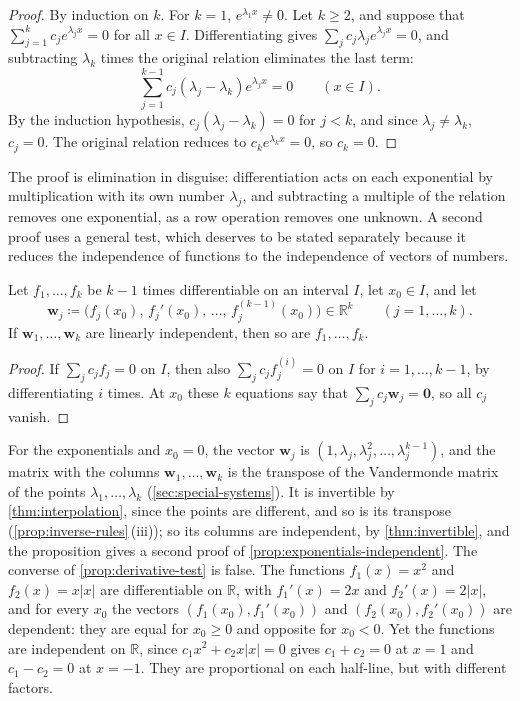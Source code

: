 \begin{proof}
By induction on $k$. For $k=1$, $e^{\lambda_1x}\ne0$. Let $k\ge2$, and suppose that $\sum_{j=1}^kc_je^{\lambda_jx}=0$ for all $x\in I$. Differentiating gives $\sum_jc_j\lambda_je^{\lambda_jx}=0$, and subtracting $\lambda_k$ times the original relation eliminates the last term:
\[
\sum_{j=1}^{k-1}c_j(\lambda_j-\lambda_k)e^{\lambda_jx}=0\qquad(x\in I).
\]
By the induction hypothesis, $c_j(\lambda_j-\lambda_k)=0$ for $j<k$, and since $\lambda_j\ne\lambda_k$, $c_j=0$. The original relation reduces to $c_ke^{\lambda_kx}=0$, so $c_k=0$.
\end{proof}

The proof is elimination in disguise: differentiation acts on each exponential by multiplication with its own number $\lambda_j$, and subtracting a multiple of the relation removes one exponential, as a row operation removes one unknown. A second proof uses a general test, which deserves to be stated separately because it reduces the independence of functions to the independence of vectors of numbers.

\begin{proposition}
\label{prop:derivative-test}
Let $f_1,\ldots,f_k$ be $k-1$ times differentiable on an interval $I$, let $x_0\in I$, and let
\[
\mathbf w_j\coloneqq\bigl(f_j(x_0),\,f_j'(x_0),\,\ldots,\,f_j^{(k-1)}(x_0)\bigr)\in\mathbb R^k\qquad(j=1,\ldots,k).
\]
If $\mathbf w_1,\ldots,\mathbf w_k$ are linearly independent, then so are $f_1,\ldots,f_k$.
\end{proposition}

\begin{proof}
If $\sum_jc_jf_j=0$ on $I$, then also $\sum_jc_jf_j^{(i)}=0$ on $I$ for $i=1,\ldots,k-1$, by differentiating $i$ times. At $x_0$ these $k$ equations say that $\sum_jc_j\mathbf w_j=\mathbf 0$, so all $c_j$ vanish.
\end{proof}

For the exponentials and $x_0=0$, the vector $\mathbf w_j$ is $(1,\lambda_j,\lambda_j^2,\ldots,\lambda_j^{k-1})$, and the matrix with the columns $\mathbf w_1,\ldots,\mathbf w_k$ is the transpose of the Vandermonde matrix of the points $\lambda_1,\ldots,\lambda_k$ (\cref{sec:special-systems}). It is invertible by \cref{thm:interpolation}, since the points are different, and so is its transpose (\cref{prop:inverse-rules}\,(iii)); so its columns are independent, by \cref{thm:invertible}, and the proposition gives a second proof of \cref{prop:exponentials-independent}. The converse of \cref{prop:derivative-test} is false. The functions $f_1(x)=x^2$ and $f_2(x)=x|x|$ are differentiable on $\mathbb R$, with $f_1'(x)=2x$ and $f_2'(x)=2|x|$, and for every $x_0$ the vectors $(f_1(x_0),f_1'(x_0))$ and $(f_2(x_0),f_2'(x_0))$ are dependent: they are equal for $x_0\ge0$ and opposite for $x_0<0$. Yet the functions are independent on $\mathbb R$, since $c_1x^2+c_2x|x|=0$ gives $c_1+c_2=0$ at $x=1$ and $c_1-c_2=0$ at $x=-1$. They are proportional on each half-line, but with different factors.

